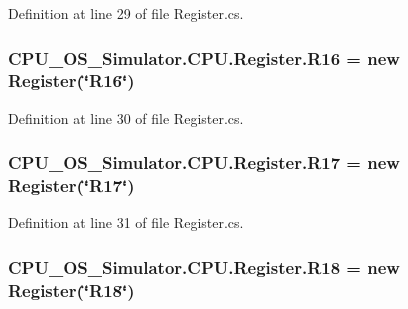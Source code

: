 Definition at line 29 of file Register.\+cs.

\hypertarget{class_c_p_u___o_s___simulator_1_1_c_p_u_1_1_register_ac008605898ab29a4ecd071f25f9e2d50}{}
\subsubsection[{R16}]{ C\+P\+U\+\_\+\+O\+S\+\_\+\+Simulator.\+C\+P\+U.\+Register.\+R16 = new {\bf Register}(\char`\"{}R16\char`\"{})\hspace{0.3cm}{\ttfamily [static]}}\label{class_c_p_u___o_s___simulator_1_1_c_p_u_1_1_register_ac008605898ab29a4ecd071f25f9e2d50}


Definition at line 30 of file Register.\+cs.

\hypertarget{class_c_p_u___o_s___simulator_1_1_c_p_u_1_1_register_add014a0021f9e8115728d7b95a398bda}{}
\subsubsection[{R17}]{ C\+P\+U\+\_\+\+O\+S\+\_\+\+Simulator.\+C\+P\+U.\+Register.\+R17 = new {\bf Register}(\char`\"{}R17\char`\"{})\hspace{0.3cm}{\ttfamily [static]}}\label{class_c_p_u___o_s___simulator_1_1_c_p_u_1_1_register_add014a0021f9e8115728d7b95a398bda}


Definition at line 31 of file Register.\+cs.

\hypertarget{class_c_p_u___o_s___simulator_1_1_c_p_u_1_1_register_aac05b1dce0cbfda874ca7c1783485095}{}
\subsubsection[{R18}]{ C\+P\+U\+\_\+\+O\+S\+\_\+\+Simulator.\+C\+P\+U.\+Register.\+R18 = new {\bf Register}(\char`\"{}R18\char`\"{})\hspace{0.3cm}{\ttfamily [static]}}\label{class_c_p_u___o_s___simulator_1_1_c_p_u_1_1_register_aac05b1dce0cbfda874ca7c1783485095}


